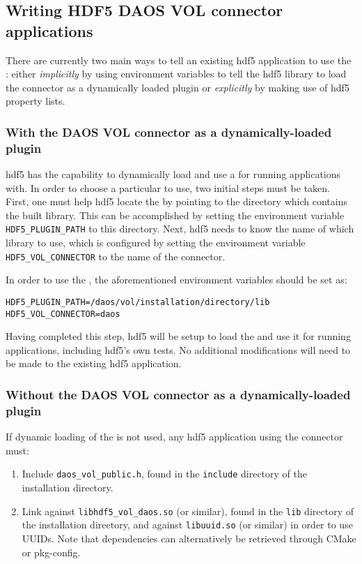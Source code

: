 \documentclass[../users_guide.tex]{subfiles}
\begin{document}
\subsection{Writing HDF5 DAOS VOL connector applications}

There are currently two main ways to tell an existing \acrshort{hdf5} application to use
the \dvc{}: either \textit{implicitly} by using environment
variables to tell the \acrshort{hdf5} library to load the connector as a dynamically loaded
plugin or \textit{explicitly} by making use of \acrshort{hdf5} property lists.

\subsubsection{With the DAOS VOL connector as a dynamically-loaded plugin}
\label{sec:dynamic_plugin}

\acrshort{hdf5} has the capability to dynamically load and use a \vc{} for running
applications with. In order to choose a particular \vc{} to use, two
initial steps must be taken. First, one must help \acrshort{hdf5} locate the \vc{}
by pointing to the directory which contains the built library. This can be
accomplished by setting the environment variable \texttt{HDF5\_PLUGIN\_PATH} to
this directory. Next, \acrshort{hdf5} needs to know the name of which library to use, which
is configured by setting the environment variable \texttt{HDF5\_VOL\_CONNECTOR}
to the name of the connector.

In order to use the \dvc{}, the aforementioned environment variables 
should be set as:

\begin{verbatim}
HDF5_PLUGIN_PATH=/daos/vol/installation/directory/lib
HDF5_VOL_CONNECTOR=daos
\end{verbatim}

Having completed this step, \acrshort{hdf5} will be setup to load the \dvc{}
and use it for running applications, including \acrshort{hdf5}'s own tests.
No additional modifications will need to be made to the existing \acrshort{hdf5} application.

\subsubsection{Without the DAOS VOL connector as a dynamically-loaded plugin}

If dynamic loading of the \dvc{} is not used, any \acrshort{hdf5} application
using the connector must:
\begin{enumerate}
 \item Include \texttt{daos\_vol\_public.h}, found in the \texttt{include}
directory of the \dvc{} installation directory.
 \item Link against \texttt{libhdf5\_vol\_daos.so} (or similar), found in
the \texttt{lib} directory of the \dvc{} installation directory, and
against \texttt{libuuid.so} (or similar) in order to use UUIDs. Note that dependencies
can alternatively be retrieved through CMake or pkg-config.
\end{enumerate}
\end{document}
